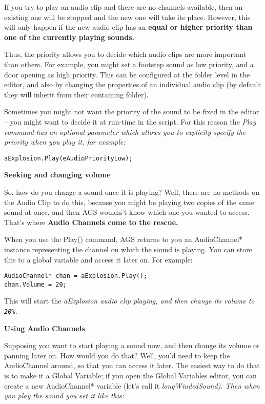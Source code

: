 If you try to play an audio clip and there are no channels available, then an existing
one will be stopped and the new one will take its place. However, this will only
happen if the new audio clip has an \bf{equal or higher} priority than one of the currently
playing sounds.

Thus, the priority allows you to decide which audio clips are more important than others.
For example, you might set a footstep sound as low priority, and a door opening as
high priority. This can be configured at the folder level in the editor, and also by
changing the properties of an individual audio clip (by default they will inherit from
their containing folder).

Sometimes you might not want the priority of the sound to be fixed in the editor -- you
might want to decide it at run-time in the script. For this reason the \it{Play} command
has an optional parameter which allows you to explicity specify the priority when you
play it, for example:
\begin{verbatim}
aExplosion.Play(eAudioPriorityLow);
\end{verbatim}

\bf{Seeking and changing volume}

So, how do you change a sound once it is playing? Well, there are no methods on the
Audio Clip to do this, because you might be playing two copies of the same sound at
once, and then AGS wouldn't know which one you wanted to access. That's where \bf{Audio
Channels} come to the rescue.

When you use the Play() command, AGS returns to you an AudioChannel* instance representing
the channel on which the sound is playing. You can store this to a global variable and
access it later on. For example:

\begin{verbatim}
AudioChannel* chan = aExplosion.Play();
chan.Volume = 20;
\end{verbatim}

This will start the \it{aExplosion} audio clip playing, and then change its volume to \verb$20%$.

\bf{Using Audio Channels}

Supposing you want to start playing a sound now, and then change its volume or panning later on.
How would you do that? Well, you'd need to keep the AudioChannel around, so that you can access
it later. The easiest way to do that is to make it a Global Variable; if you open the Global Variables
editor, you can create a new AudioChannel* variable (let's call it \it{longWindedSound}). Then when
you play the sound you set it like this:

